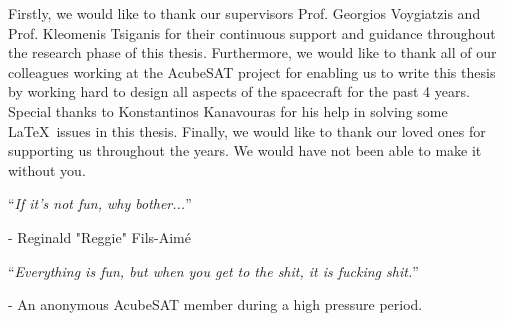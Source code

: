 \documentclass[
11pt, %
english, %
onehalfspacing, %
parskip, %
headsepline, %
]{MastersDoctoralThesis} %
\begin{document}

\begin{acknowledgements}
\addchaptertocentry{\acknowledgementname} %
Firstly, we would like to thank our supervisors Prof. Georgios Voygiatzis and Prof. Kleomenis Tsiganis for their continuous support and guidance throughout the research phase of this thesis. Furthermore, we would like to thank all of our colleagues working at the AcubeSAT project for enabling us to write this thesis by working hard to design all aspects of the spacecraft for the past 4 years. Special thanks to Konstantinos Kanavouras for his help in solving some \LaTeX\  issues in this thesis. Finally, we would like to thank our loved ones for supporting us throughout the years. We would have not been able to make it without you.

\vspace*{0.2\textheight}
\noindent\enquote{\itshape If it's not fun, why bother...}\bigbreak

\hfill - Reginald "Reggie" Fils-Aimé

\vspace*{0.1\textheight}

\noindent\enquote{\itshape Everything is fun, but when you get to the shit, it is fucking shit.}\bigbreak

\hfill - An anonymous AcubeSAT member during a high pressure period.

\end{acknowledgements}


\tableofcontents %

\listoffigures %

\listoftables %

\end{document}
